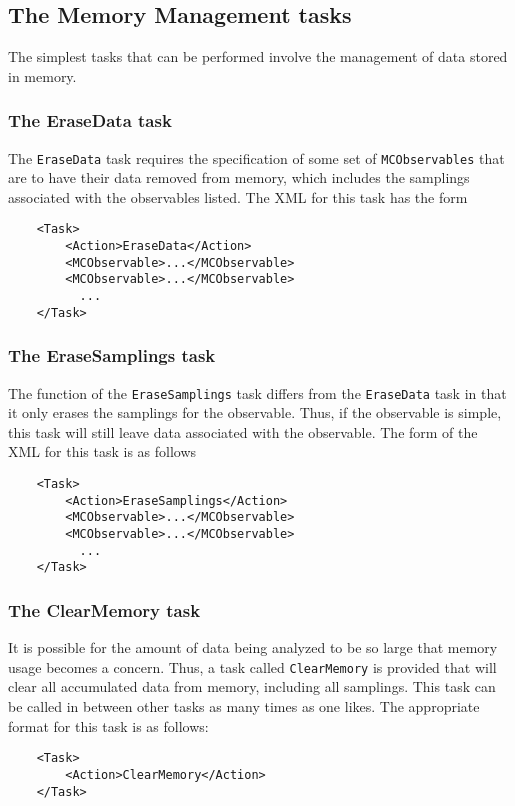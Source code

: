 \documentclass[12pt,notitlepage,letterpaper]{article}
\newcommand{\vb}{\texttt}
\begin{document}
\subsection{The Memory Management tasks}

The simplest tasks that can be performed involve the management
of data stored in memory.

\subsubsection{The EraseData task}

The \vb{EraseData} task requires the specification of some set
of \vb{MCObservables} that are to have their data removed
from memory, which includes the samplings associated with
the observables listed. The XML for this task has the form
\begin{verbatim}
    <Task>
        <Action>EraseData</Action>
        <MCObservable>...</MCObservable> 
        <MCObservable>...</MCObservable>
          ...
    </Task>
\end{verbatim}

\subsubsection{The EraseSamplings task}

The function of the \vb{EraseSamplings} task differs from the
\vb{EraseData} task in that it only erases the samplings for
the observable. Thus, if the observable is simple, this task
will still leave data associated with the observable. The form
of the XML for this task is as follows
\begin{verbatim}
    <Task>
        <Action>EraseSamplings</Action>
        <MCObservable>...</MCObservable> 
        <MCObservable>...</MCObservable>
          ...
    </Task>
\end{verbatim}

\subsubsection{The ClearMemory task}

It is possible
for the amount of data being analyzed to be so large that memory usage
becomes a concern. Thus, a task called \vb{ClearMemory} is
provided that will clear all accumulated data from memory, including
all samplings. This task can be called
in between other tasks as many times as one likes.
The appropriate format for
this task is as follows:
\begin{verbatim}
    <Task>
        <Action>ClearMemory</Action>
    </Task>
\end{verbatim}
\end{document}
